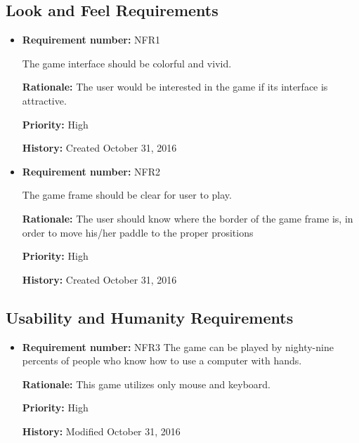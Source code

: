 \documentclass[12pt,letterpaper]{article}
\begin{document}
\subsection{Look and Feel Requirements}

\begin{reqbox}
	\begin{itemize}
	\item \textbf{Requirement number: }NFR1

		The game interface should be colorful and vivid.

		\textbf{Rationale: } The user would be interested in the game if its interface is attractive.

		\textbf{Priority: }High

		\textbf{History: }Created October 31, 2016
	
		\item \textbf{Requirement number: }NFR2

		The game frame should be clear for user to play.

		\textbf{Rationale: } The user should know where the border of the game frame is, in order to move his/her paddle to the proper prositions

		\textbf{Priority: }High

		\textbf{History: }Created October 31, 2016

	\end{itemize}
\end{reqbox}


\subsection{Usability and Humanity Requirements}

\begin{reqbox}
	\begin{itemize}
	\subsubsection{Ease of Use Requirements}	

	\item \textbf{Requirement number: }NFR3
	   	The game can be played by nighty-nine percents of people who know  how to use a computer with hands.

		\textbf{Rationale: } This game utilizes only mouse and keyboard.

		\textbf{Priority: }High

		\textbf{History: }Modified October 31, 2016

	\end{itemize}
\end{reqbox}
\end{document}
